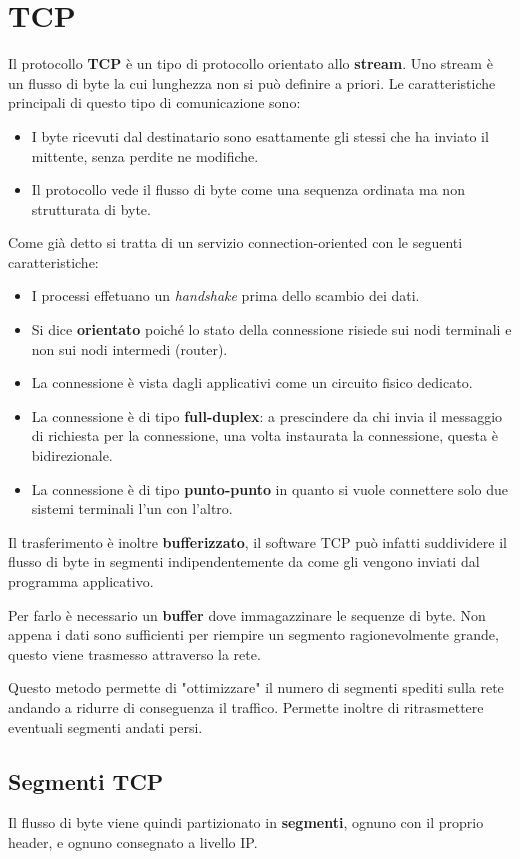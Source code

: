 \section{TCP}
Il protocollo \textbf{TCP} è un tipo di protocollo orientato allo 
\textbf{stream}. Uno stream è un flusso di byte la cui lunghezza non si
può definire a priori. Le caratteristiche principali di questo tipo di 
comunicazione sono:
\begin{itemize}
	\item I byte ricevuti dal destinatario sono esattamente gli stessi
		che ha inviato il mittente, senza perdite ne modifiche.
	\item Il protocollo vede il flusso di byte come una sequenza 
		ordinata ma non strutturata di byte.
\end{itemize}
Come già detto si tratta di un servizio connection-oriented con le 
seguenti caratteristiche:
\begin{itemize}
	\item I processi effetuano un \emph{handshake} prima dello 
		scambio dei dati.
	\item Si dice \textbf{orientato} poiché lo stato della connessione 
		risiede sui nodi terminali e non sui nodi intermedi (router).
	\item La connessione è vista dagli applicativi come un circuito 
		fisico dedicato.
	\item La connessione è di tipo \textbf{full-duplex}: a prescindere 
		da chi invia il messaggio di richiesta per la connessione, una 
		volta instaurata la connessione, questa è bidirezionale.
	\item La connessione è di tipo \textbf{punto-punto} in quanto si 
		vuole connettere solo due sistemi terminali l'un con l'altro.
\end{itemize}
Il trasferimento è inoltre \textbf{bufferizzato}, il software TCP può 
infatti suddividere il flusso di byte in segmenti indipendentemente da 
come gli vengono inviati dal programma applicativo.

Per farlo è necessario un \textbf{buffer} dove immagazzinare le 
sequenze di byte. Non appena i dati sono sufficienti per riempire un 
segmento ragionevolmente grande, questo viene trasmesso attraverso la
rete.

Questo metodo permette di "ottimizzare" il numero di segmenti spediti 
sulla rete andando a ridurre di conseguenza il traffico. Permette 
inoltre di ritrasmettere eventuali segmenti andati persi.

\subsection{Segmenti TCP}
Il flusso di byte viene quindi partizionato in \textbf{segmenti}, 
ognuno con il proprio header, e ognuno consegnato a livello IP.

